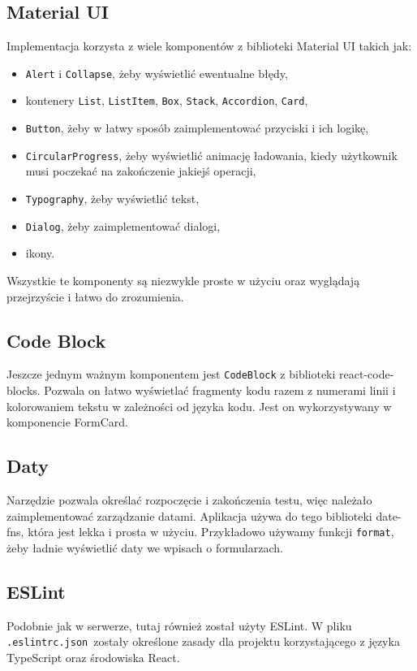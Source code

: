 \subsection{Material UI}
Implementacja korzysta z wiele komponentów z biblioteki Material UI takich jak:
\begin{itemize}
  \item \texttt{Alert} i \texttt{Collapse}, żeby wyświetlić ewentualne błędy,
  \item kontenery \texttt{List}, \texttt{ListItem}, \texttt{Box}, \texttt{Stack},
    \texttt{Accordion}, \texttt{Card},
  \item \texttt{Button}, żeby w łatwy sposób zaimplementować przyciski
    i ich logikę,
  \item \texttt{CircularProgress}, żeby wyświetlić animację ładowania, kiedy
    użytkownik musi poczekać na zakończenie jakiejś operacji,
  \item \texttt{Typography}, żeby wyświetlić tekst,
  \item \texttt{Dialog}, żeby zaimplementować dialogi,
  \item ikony.
\end{itemize}
Wszystkie te komponenty są niezwykle proste w użyciu oraz wyglądają przejrzyście
i łatwo do zrozumienia.
\subsection{Code Block}
Jeszcze jednym ważnym komponentem jest \texttt{CodeBlock} z biblioteki react-code-blocks.
Pozwala on łatwo wyświetlać fragmenty kodu razem z numerami linii i kolorowaniem
tekstu w zależności od języka kodu. Jest on wykorzystywany w komponencie FormCard.
\subsection{Daty}
Narzędzie pozwala określać rozpoczęcie i zakończenia testu, więc należało
zaimplementować zarządzanie datami. Aplikacja używa do tego biblioteki date-fns,
która jest lekka i prosta w użyciu. Przykładowo używamy funkcji \texttt{format}, żeby
ładnie wyświetlić daty we wpisach o formularzach.

\subsection{ESLint}
Podobnie jak w serwerze, tutaj również został użyty ESLint. W pliku
\texttt{.eslintrc.json}~zostały określone zasady dla projektu korzystającego
z języka TypeScript oraz środowiska React.

